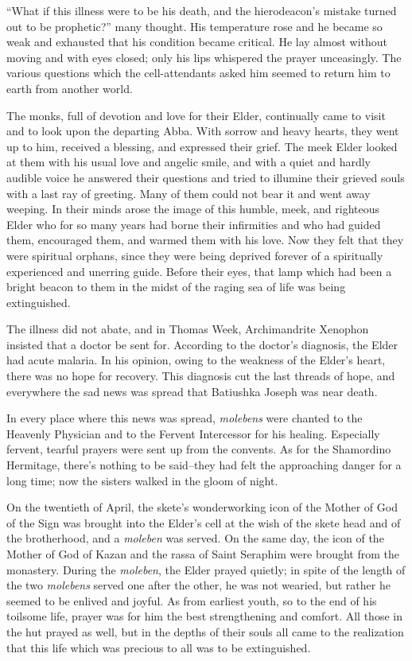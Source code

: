 “What if this illness were to be his death, and the hierodeacon's mistake turned out to be prophetic?” many thought. His temperature rose and he became so weak and exhausted that his condition became critical. He lay almost without moving and with eyes closed; only his lips whispered the prayer unceasingly. The various questions which the cell-attendants asked him seemed to return him to earth from another world.

The monks, full of devotion and love for their Elder, continually came to visit and to look upon the departing Abba. With sorrow and heavy hearts, they went up to him, received a blessing, and expressed their grief. The meek Elder looked at them with his usual love and angelic smile, and with a quiet and hardly audible voice he answered their questions and tried to illumine their grieved souls with a last ray of greeting. Many of them could not bear it and went away weeping. In their minds arose the image of this humble, meek, and righteous Elder who for so many years had borne their infirmities and who had guided them, encouraged them, and warmed them with his love. Now they felt that they were spiritual orphans, since they were being deprived forever of a spiritually experienced and unerring guide. Before their eyes, that lamp which had been a bright beacon to them in the midst of the raging sea of life was being extinguished.

The illness did not abate, and in Thomas Week, Archimandrite Xenophon insisted that a doctor be sent for. According to the doctor's diagnosis, the Elder had acute malaria. In his opinion, owing to the weakness of the Elder's heart, there was no hope for recovery. This diagnosis cut the last threads of hope, and everywhere the sad news was spread that Batiushka Joseph was near death.

In every place where this news was spread, \textit{molebens} were chanted to the Heavenly Physician and to the Fervent Intercessor for his healing. Especially fervent, tearful prayers were sent up from the convents. As for the Shamordino Hermitage, there's nothing to be said--they had felt the approaching danger for a long time; now the sisters walked in the gloom of night.

On the twentieth of April, the skete's wonderworking icon of the Mother of God of the Sign was brought into the Elder's cell at the wish of the skete head and of the brotherhood, and a \textit{moleben} was served. On the same day, the icon of the Mother of God of Kazan and the rassa of Saint Seraphim were brought from the monastery. During the \textit{moleben}, the Elder prayed quietly; in spite of the length of the two \textit{molebens} served one after the other, he was not wearied, but rather he seemed to be enlived and joyful. As from earliest youth, so to the end of his toilsome life, prayer was for him the best strengthening and comfort. All those in the hut prayed as well, but in the depths of their souls all came to the realization that this life which was precious to all was to be extinguished.

